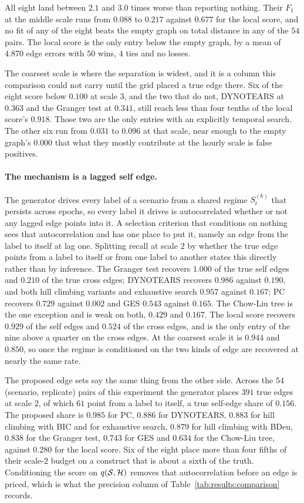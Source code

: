 All eight land between $2.1$ and $3.0$ times worse than reporting nothing.
Their $F_1$ at the middle scale runs from $0.088$ to $0.217$ against $0.677$
for the local score, and no fit of any of the eight beats the empty graph on
total distance in any of the $54$ pairs. The local score is the only entry
below the empty graph, by a mean of $4.870$ edge errors with $50$ wins, $4$ ties
and no losses.

The coarsest scale is where the separation is widest, and it is a column this
comparison could not carry until the grid placed a true edge there. Six of the
eight score below $0.100$ at scale $3$, and the two that do not, DYNOTEARS at
$0.363$ and the Granger test at $0.341$, still reach less than four tenths of
the local score's $0.918$. Those two are the only entries with an explicitly
temporal search. The other six run from $0.031$ to $0.096$ at that scale, near
enough to the empty graph's $0.000$ that what they mostly contribute at the
hourly scale is false positives.

\paragraph{The mechanism is a lagged self edge.}
The generator drives every label of a scenario from a shared regime $S_t^{(k)}$
that persists across epochs, so every label it drives is autocorrelated whether
or not any lagged edge points into it. A selection criterion that conditions on
nothing sees that autocorrelation and has one place to put it, namely an edge
from the label to itself at lag one. Splitting recall at scale $2$ by whether
the true edge points from a label to itself or from one label to another states
this directly rather than by inference. The Granger test recovers $1.000$ of
the true self edges and $0.210$ of the true cross edges; DYNOTEARS recovers
$0.986$ against $0.190$, and both hill climbing variants and exhaustive search
$0.957$ against $0.167$; PC recovers $0.729$ against $0.002$ and GES $0.543$
against $0.165$. The Chow-Liu tree is the one exception and is weak on both,
$0.429$ and $0.167$. The local score recovers $0.929$ of the self edges and
$0.524$ of the cross edges, and is the only entry of the nine above a quarter on
the cross edges. At the coarsest scale it is $0.944$ and $0.850$, so once the
regime is conditioned on the two kinds of edge are recovered at nearly the same
rate.

The proposed edge sets say the same thing from the other side. Across the $54$
(scenario, replicate) pairs of this experiment the generator places $391$ true
edges at scale $2$, of which $61$ point from a label to itself, a true
self-edge share of $0.156$. The proposed share is $0.985$ for PC, $0.886$ for
DYNOTEARS, $0.883$ for hill climbing with BIC and for exhaustive search,
$0.879$ for hill climbing with BDeu, $0.838$ for the Granger test, $0.743$ for
GES and $0.634$ for the Chow-Liu tree, against $0.280$ for the local score. Six
of the eight place more than four fifths of their scale-$2$ budget on a
construct that is about a sixth of the truth. Conditioning the score
on $q({\mathcal{S}},{\mathcal{H}})$ removes that autocorrelation before an edge is priced, which is
what the precision column of Table~\ref{tab:results:comparison} records.

